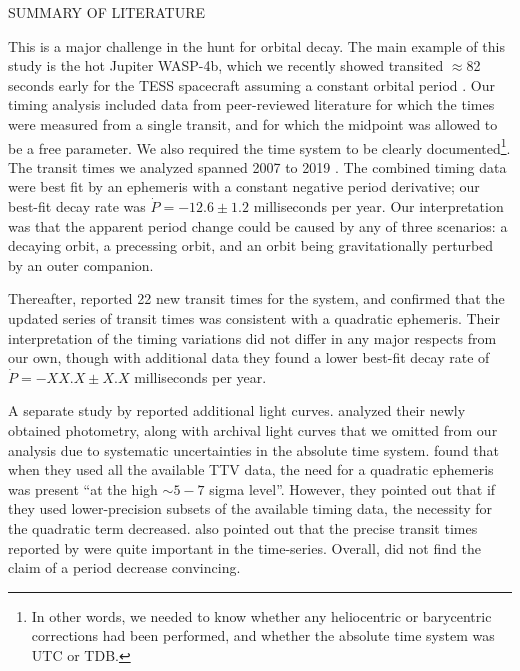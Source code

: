 \documentclass[12pt,twocolumn,tighten]{aastex62}
\begin{document}
SUMMARY OF LITERATURE

This is a major challenge in the hunt for orbital decay.  The main
example of this study is the hot Jupiter WASP-4b, which we recently
showed transited $\approx$82 seconds early for the TESS spacecraft
assuming a constant orbital period \citep{bouma_wasp-4b_2019}.  Our
timing analysis included data from peer-reviewed literature for which
the times were measured from a single transit, and for which the
midpoint was allowed to be a free parameter. We also required the time
system to be clearly documented\footnote{In other words, we needed to
know whether any heliocentric or barycentric corrections had been
performed, and whether the absolute time system was UTC or TDB.}. The
transit times we analyzed spanned 2007 to 2019
\citep{wilson_wasp-4b_2008,gillon_improved_2009,winn_transit_2009,dragomir_terms_2011,sanchis-ojeda_starspots_2011,nikolov_wasp-4b_2012,hoyer_tramos_2013,ranjan_atmospheric_2014,huitson_gemini_2017}.
The combined timing data were best fit by an ephemeris with a constant
negative period derivative; our best-fit decay rate was $\dot{P} =
-12.6 \pm 1.2$ milliseconds per year.  Our interpretation was that the
apparent period change could be caused by any of three scenarios: a
decaying orbit, a precessing orbit, and an orbit being gravitationally
perturbed by an outer companion.

Thereafter, \citet{southworth_transit_2019} reported 22 new transit
times for the system, and confirmed that the updated series of transit
times was consistent with a quadratic ephemeris.  Their interpretation
of the timing variations did not differ in any major respects from our
own, though with additional data they found a lower best-fit decay
rate of $\dot{P} = -XX.X \pm X.X$ milliseconds per year.

A separate study by \citet{baluev_homogeneously_2019} reported
additional light curves. \citeauthor{baluev_homogeneously_2019}
analyzed their newly obtained photometry, along with archival light
curves that we omitted from our analysis due to systematic
uncertainties in the absolute time system.
\citeauthor{baluev_homogeneously_2019} found that when they used all
the available TTV data, the need for a quadratic ephemeris was present
``at the high $\sim 5-7$ sigma level''.  However, they pointed out
that if they used lower-precision subsets of the available timing
data, the necessity for the quadratic term decreased.
\citeauthor{baluev_homogeneously_2019} also pointed out that the
precise transit times reported by \citet{huitson_gemini_2017} were
quite important in the time-series.  Overall,
\citeauthor{baluev_homogeneously_2019} did not find the claim of a
period decrease convincing.
\end{document}

